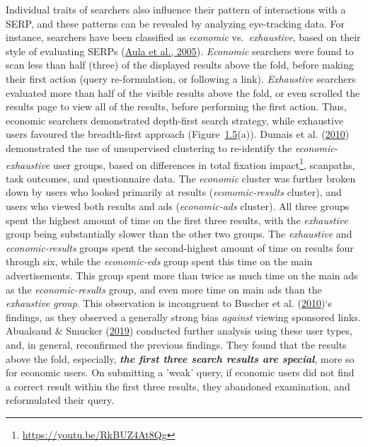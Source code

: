\documentclass[a4paper, nobind]{templates/ociamthesis}
\begin{document}
Individual traits of searchers also influence their pattern of
interactions with a SERP, and these patterns can be revealed by
analyzing eye-tracking data. For instance, searchers have been
classified as \emph{economic} vs.~\emph{exhaustive}, based on their style of
evaluating SERPs (\protect\hyperlink{ref-102}{Aula et al., 2005}). \emph{Economic} searchers were found to scan less
than half (three) of the displayed results above the fold, before making
their first action (query re-formulation, or following a link).
\emph{Exhaustive} searchers evaluated more than half of the visible results
above the fold, or even scrolled the results page to view all of the
results, before performing the first action. Thus, economic searchers
demonstrated depth-first search strategy, while exhaustive users
favoured the breadth-first approach
(Figure~\protect\hyperlink{fig_res_L_serp_user_chars}{1.5}(a)). Dumais et al. (\protect\hyperlink{ref-117}{2010}) demonstrated the use of
unsupervised clustering to re-identify the \emph{economic}-\emph{exhaustive} user
groups, based on differences in total fixation impact\footnote{\url{https://youtu.be/RkBUZ4At8Qg}}, scanpaths,
task outcomes, and questionnaire data. The \emph{economic} cluster was
further broken down by users who looked primarily at results
(\emph{economic-results} cluster), and users who viewed both results and ads
(\emph{economic-ads} cluster). All three groups spent the highest amount of
time on the first three results, with the \emph{exhaustive} group being
substantially slower than the other two groups. The \emph{exhaustive} and
\emph{economic-results} groups spent the second-highest amount of time on
results four through six, while the \emph{economic-eds} group spent this time
on the main advertisements. This group spent more than twice as much
time on the main ads as the \emph{economic-results} group, and even more time
on main ads than the \emph{exhaustive group}. This observation is incongruent
to Buscher et al. (\protect\hyperlink{ref-115}{2010})`s findings, as they observed a generally strong bias \emph{against}
viewing sponsored links. Abualsaud \& Smucker (\protect\hyperlink{ref-135}{2019}) conducted further analysis using these
user types, and, in general, reconfirmed the previous findings. They
found that the results above the fold, especially, \textbf{\emph{the first three
search results are special}}, more so for economic users. On submitting
a 'weak' query, if economic users did not find a correct result within
the first three results, they abandoned examination, and reformulated
their query.
\end{document}
